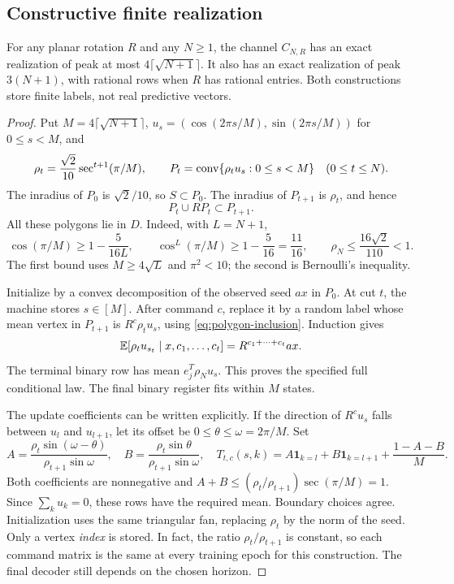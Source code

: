 \subsection{Constructive finite realization}
\begin{theorem}\label{thm:polygon-upper}
For any planar rotation $R$ and any $N\ge1$, the channel $C_{N,R}$ has
an exact realization of peak at most $4\lceil\sqrt{N+1}\rceil$.
It also has an exact realization of peak $3(N+1)$, with rational rows
when $R$ has rational entries. Both constructions store finite labels,
not real predictive vectors.
\end{theorem}
\begin{proof}
Put $M=4\lceil\sqrt{N+1}\rceil$, $u_s=(\cos(2\pi s/M),
\sin(2\pi s/M))$ for $0\le s<M$, and
\[
 \rho_t=\frac{\sqrt2}{10}\sec^{t+1}(\pi/M),\qquad
 P_t=\operatorname{conv}\{\rho_tu_s:0\le s<M\}\quad(0\le t\le N).
\]
The inradius of $P_0$ is $\sqrt2/10$, so $S\subset P_0$.
The inradius of $P_{t+1}$ is $\rho_t$, and hence
\begin{equation}\label{eq:polygon-inclusion}
                         P_t\cup RP_t\subset P_{t+1}.
\end{equation}
All these polygons lie in $D$. Indeed, with $L=N+1$,
\[
 \cos(\pi/M)\ge1-\frac5{16L},\qquad
 \cos^L(\pi/M)\ge1-\frac5{16}=\frac{11}{16},
 \qquad \rho_N\le\frac{16\sqrt2}{110}<1.
\]
The first bound uses $M\ge4\sqrt L$ and $\pi^2<10$; the second is
Bernoulli's inequality.

Initialize by a convex decomposition of the observed seed $a x$ in
$P_0$. At cut $t$, the machine stores $s\in[M]$. After command $c$,
replace it by a random label whose mean vertex in $P_{t+1}$ is
$R^c\rho_tu_s$, using \eqref{eq:polygon-inclusion}. Induction gives
\[
 \mathbb E[\rho_tu_{s_t}\mid x,c_1,\ldots,c_t]
                         =R^{c_1+\cdots+c_t}a x.
\]
The terminal binary row has mean $e_j^T\rho_Nu_s$. This proves the
specified full conditional law. The final binary register fits within
$M$ states.

The update coefficients can be written explicitly. If the direction of
$R^cu_s$ falls between $u_l$ and $u_{l+1}$, let its offset be
$0\le\theta\le\omega=2\pi/M$. Set
\[
 A=\frac{\rho_t\sin(\omega-\theta)}{\rho_{t+1}\sin\omega},\quad
 B=\frac{\rho_t\sin\theta}{\rho_{t+1}\sin\omega},\quad
 T_{t,c}(s,k)=A\mathbf1_{k=l}+B\mathbf1_{k=l+1}+\frac{1-A-B}{M}.
\]
Both coefficients are nonnegative and
$A+B\le(\rho_t/\rho_{t+1})\sec(\pi/M)=1$.
Since $\sum_ku_k=0$, these rows have the required mean. Boundary
choices agree. Initialization uses the same triangular fan, replacing
$\rho_t$ by the norm of the seed. Only a vertex \emph{index} is stored.
In fact, the ratio $\rho_t/\rho_{t+1}$ is constant, so each command
matrix is the same at every training epoch for this construction.
The final decoder still depends on the chosen horizon.


\end{proof}
